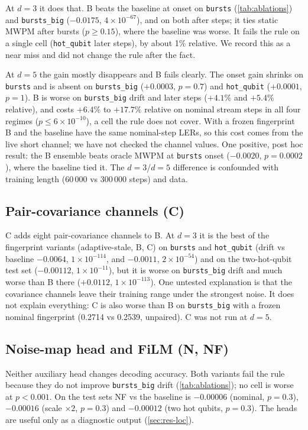 \documentclass[11pt,a4paper]{article}
\newcommand{\reg}[1]{\texttt{#1}}
\newcommand{\E}[2]{${#1}{\times}10^{-#2}$}  %
\newcommand{\Eb}[2]{{#1}{\times}10^{-#2}}   %
\begin{document}
At $d=3$ it does that. B beats the baseline at onset on \reg{bursts} (\cref{tab:ablations}) and \reg{bursts\_big}
($-0.0175$, \E{4}{67}), and on both after steps; it ties static MWPM after bursts ($p\ge0.15$), where the baseline was
worse. It fails the rule on a single cell (\reg{hot\_qubit} later steps), by about 1\% relative. We record this as a near miss and did not change the rule after the fact.

At $d=5$ the gain mostly disappears and B fails clearly. The onset gain shrinks on \reg{bursts} and is absent on \reg{bursts\_big} ($+0.0003$, $p=0.7$) and \reg{hot\_qubit} ($+0.0001$, $p=1$). B is worse on
\reg{bursts\_big} drift and later steps ($+4.1\%$ and $+5.4\%$ relative), and costs
$+6.4\%$ to $+17.7\%$ relative on nominal stream steps in all four regimes ($p\le\Eb{6}{10}$), a cell the rule does not
cover. With a frozen fingerprint B and the baseline have the same nominal-step LERs, so this cost comes from the
live short channel; we have not checked the channel values. One positive, post hoc result: the B ensemble beats oracle MWPM
at \reg{bursts} onset ($-0.0020$, $p=0.0002$), where the baseline tied it. The $d=3$/$d=5$ difference is confounded
with training length (60\,000 vs 300\,000 steps) and data.

\subsection{Pair-covariance channels (C)}
C adds eight pair-covariance channels to B. At $d=3$ it is the best of the fingerprint variants (adaptive-stale, B, C) on \reg{bursts} and \reg{hot\_qubit} (drift
vs baseline $-0.0064$, \E{1}{114}, and $-0.0011$, \E{2}{54}) and on the two-hot-qubit test set ($-0.00112$, \E{1}{11}),
but it is worse on \reg{bursts\_big} drift and much worse than B there ($+0.0112$, \E{1}{113}).
One untested explanation is that the covariance channels leave their training range under the strongest noise. It
does not explain everything: C is also worse than B on \reg{bursts\_big} with a frozen nominal fingerprint (0.2714 vs
0.2539, unpaired). C was not run at $d=5$.

\subsection{Noise-map head and FiLM (N, NF)}
Neither auxiliary head changes decoding accuracy. Both variants fail the rule because they do not improve
\reg{bursts\_big} drift (\cref{tab:ablations}); no cell is worse at $p<0.001$. On the test sets NF vs the baseline is $-0.00006$ (nominal, $p=0.3$), $-0.00016$ (scale $\times2$,
$p=0.3$) and $-0.00012$ (two hot qubits, $p=0.3$). The heads are useful only as a diagnostic output (\cref{sec:res-loc}).
\end{document}
